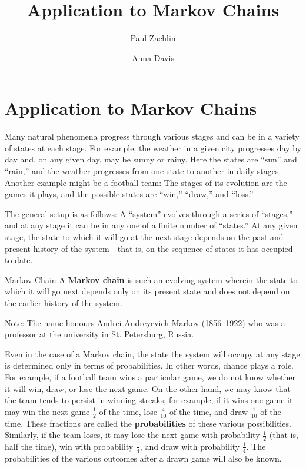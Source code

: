 \documentclass{ximera}
\author{Paul Zachlin \and Anna Davis} \title{Application to Markov Chains} \license{CC-BY 4.0}
\begin{document}
\begin{abstract}
\end{abstract}
\maketitle

\section*{Application to Markov Chains}
Many natural phenomena progress through various stages and can be in a variety of states at each stage. For example, the weather in a given city progresses day by day and, on any given day, may be sunny or rainy. Here the states are ``sun'' and ``rain,'' and the weather progresses from one state to another in daily stages. Another example might be a football team: The stages of its evolution are the games it plays, and the possible states are ``win,'' ``draw,'' and ``loss.''


The general setup is as follows: A ``system'' evolves through a series of ``stages,'' and at any stage it can be in any one of a finite number of ``states.'' At any given stage, the state to which it will go at the next stage depends on the past and present history of the system---that is, on the sequence of states it has occupied to date.


\begin{definition}{Markov Chain}\label{007191}
A \textbf{Markov chain} is such an evolving system wherein the state to which it will go next depends only on its present state and does not depend on the earlier history of the system.
\end{definition}
Note: The name honours Andrei Andreyevich Markov (1856--1922) who was a professor at the university in St. Petersburg, Russia.

Even in the case of a Markov chain, the state the system will occupy at any stage is determined only in terms of probabilities. In other words, chance plays a role. For example, if a football team wins a particular game, we do not know whether it will win, draw, or lose the next game. On the other hand, we may know that the team tends to persist in winning streaks; for example, if it wins one game it may win the next game $\frac{1}{2}$ of the time, lose $\frac{4}{10}$ of the time, and draw $\frac{1}{10}$ of the time. These fractions are called the \textbf{probabilities} of these various possibilities. Similarly, if the team loses, it may lose the next game with probability $\frac{1}{2}$ (that is, half the time), win with probability $\frac{1}{4}$, and draw with probability $\frac{1}{4}$. The probabilities of the various outcomes after a drawn game will also be known.
\end{document}
